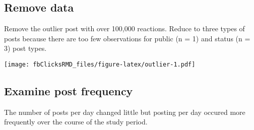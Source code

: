 \documentclass[
]{article}
\newenvironment{Shaded}{\begin{snugshade}}{\end{snugshade}}
\newcommand{\CommentTok}[1]{\textcolor[rgb]{0.56,0.35,0.01}{\textit{#1}}}
\newcommand{\DataTypeTok}[1]{\textcolor[rgb]{0.13,0.29,0.53}{#1}}
\newcommand{\DecValTok}[1]{\textcolor[rgb]{0.00,0.00,0.81}{#1}}
\newcommand{\KeywordTok}[1]{\textcolor[rgb]{0.13,0.29,0.53}{\textbf{#1}}}
\newcommand{\NormalTok}[1]{#1}
\newcommand{\OperatorTok}[1]{\textcolor[rgb]{0.81,0.36,0.00}{\textbf{#1}}}
\newcommand{\StringTok}[1]{\textcolor[rgb]{0.31,0.60,0.02}{#1}}
\begin{document}
\hypertarget{remove-data}{%
\subsection{Remove data}\label{remove-data}}

Remove the outlier post with over 100,000 reactions. Reduce to three
types of posts because there are too few observations for public (n = 1)
and status (n = 3) post types.

\texttt{[image: fbClicksRMD\_files/figure-latex/outlier-1.pdf]}

\begin{Shaded}
\end{Shaded}

\hypertarget{examine-post-frequency}{%
\subsection{Examine post frequency}\label{examine-post-frequency}}

The number of posts per day changed little but posting per day occured
more frequently over the course of the study period.

\begin{Shaded}
\end{Shaded}
\end{document}
